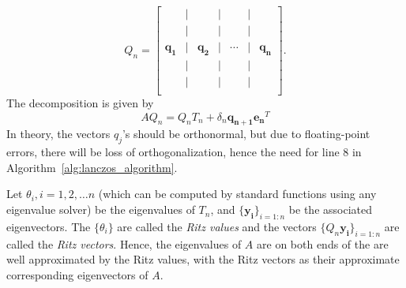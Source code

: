 	\[
	Q_n = 
	\begin{bmatrix}
		 & \big| &  & \big| &  & \big| &  \\
		 & \big| &  & \big| &  & \big| &  \\
		 \mathbf{q_1} & \big| & \mathbf{q_2} & \big| & \cdots & \big| & \mathbf{q_n} \\
		 & \big| &  & \big| &  & \big| &  \\
		 & \big| &  & \big| &  & \big| &  \\
	\end{bmatrix}.
	\]
The decomposition is given by
\begin{equation}\label{eq:Lanczos_Decomposition}
	AQ_n = Q_nT_n + \delta_{n}\mathbf{q_{n+1}}\mathbf{e_n}^T
\end{equation}
In theory, the vectors $q_j$'s should be orthonormal, but due to floating-point errors, there will be loss of orthogonalization, hence the need for line $8$ in Algorithm~\ref{alg:lanczos_algorithm}.

Let $\theta_i, i = 1,2, \ldots n$ (which can be computed by standard functions using any eigenvalue solver) be the eigenvalues of $T_n$, and $\{\mathbf{y_i}\}_{i = 1 : n}$ be the associated eigenvectors. The $\{\theta_i\}$ are called the \textit{Ritz values} and the vectors $\{Q_n\mathbf{y_i}\}_{i = 1 : n}$ are called the \textit{Ritz vectors}. Hence, the eigenvalues of $A$ are on both ends of the are well approximated by the Ritz values, with the Ritz vectors as their approximate corresponding eigenvectors of $A$.

